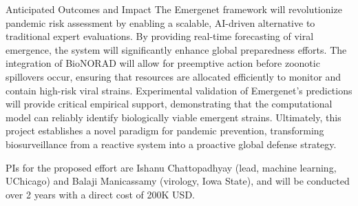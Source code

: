 \documentclass[onecolumn, compsoc,10pt]{IEEEtran}
\begin{document}
Anticipated Outcomes and Impact
The Emergenet framework will revolutionize pandemic risk assessment by enabling a scalable, AI-driven alternative to traditional expert evaluations. By providing real-time forecasting of viral emergence, the system will significantly enhance global preparedness efforts. The integration of BioNORAD will allow for preemptive action before zoonotic spillovers occur, ensuring that resources are allocated efficiently to monitor and contain high-risk viral strains. Experimental validation of Emergenet’s predictions will provide critical empirical support, demonstrating that the computational model can reliably identify biologically viable emergent strains. Ultimately, this project establishes a novel paradigm for pandemic prevention, transforming biosurveillance from a reactive system into a proactive global defense strategy.



PIs for the proposed effort are Ishanu Chattopadhyay (lead, machine learning, UChicago) and Balaji Manicassamy (virology, Iowa State), and will be conducted over 2 years with a direct cost of 200K USD. 

\small


\end{document}
